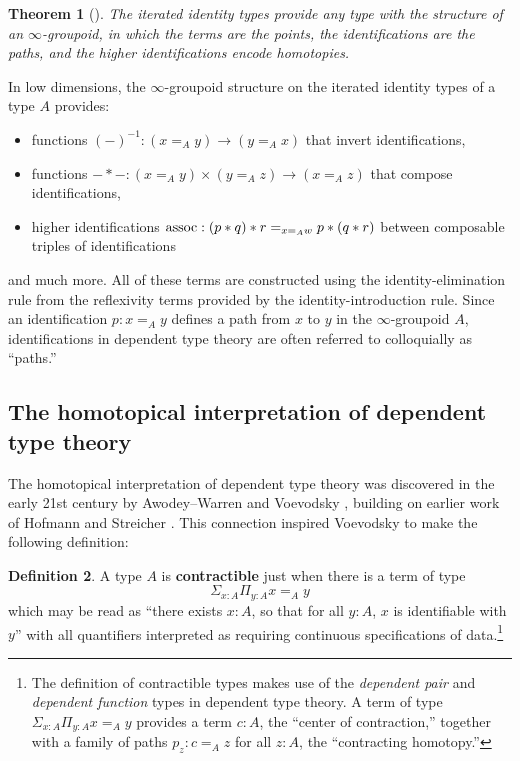\documentclass[11pt]{ctexart}
\newtheorem{thm}{Theorem}[section]
\theoremstyle{definition}
\newtheorem{defn}[thm]{Definition}
\theoremstyle{remark}
\numberwithin{equation}{section}
\newcommand{\1}{\mathbbe{1}}
\newcommand{\2}{\mathbbe{2}}
\newcommand{\3}{\mathbbe{3}}
\begin{document}
\begin{thm}[{\cite{vBG,lumsdaine}}] The iterated identity types provide any type with the structure of an $\infty$-groupoid, in which the terms are the points, the identifications are the paths, and the higher identifications encode homotopies.
\end{thm}

In low dimensions, the $\infty$-groupoid structure on the iterated identity types of a type $A$ provides:
\begin{itemize}
    \item functions $ (-)^{-1} : (x=_A y) \to (y=_Ax)$ that invert identifications,
    \item functions $-\ast- :  (x=_Ay) \times (y=_Az) \to (x=_A z)$ that compose identifications,
    \item higher identifications $\textup{assoc} : (p \ast q) \ast r =_{x =_A w} p \ast (q \ast r)$ between composable triples of identifications
\end{itemize}
and much more. All of these terms are constructed using the identity-elimination rule from the reflexivity terms provided by the identity-introduction rule. Since an identification $p : x=_A y$ defines a path from $x$ to $y$ in the $\infty$-groupoid $A$, identifications in dependent type theory are often referred to colloquially as ``paths.''

\subsection*{The homotopical interpretation of dependent type theory}

The homotopical interpretation of dependent type theory was discovered in the early 21st century by Awodey--Warren \cite{AW}
 and Voevodsky \cite{V},   
  building on earlier work of Hofmann and Streicher  \cite{HS}. 
   This connection inspired Voevodsky to make the following definition:

\begin{defn}\label{defn:contractible} A type $A$ is \textbf{contractible} just when there is a term of type \[ \Sigma_{x :A} \Pi_{y : A} x=_A y\]
    which may be read as ``there exists $x:A$, so that for all $y :A$, $x$ is identifiable with $y$'' with all quantifiers interpreted as requiring continuous specifications of data.\footnote{The definition of contractible types makes use of the \emph{dependent pair} and \emph{dependent function} types in dependent type theory. A term of type $\Sigma_{x :A} \Pi_{y : A} x=_A y$ provides a term $c : A$, the ``center of contraction,'' together with a family of paths $p_z : c =_A z$ for all $z : A$, the ``contracting homotopy.''}
\end{defn}
\end{document}
